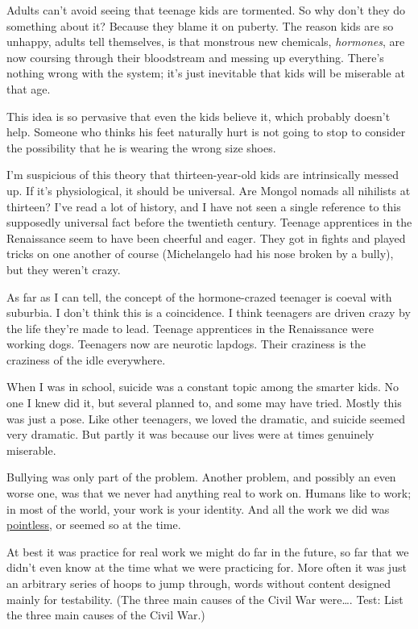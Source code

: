 Adults can't avoid seeing that teenage kids are tormented. So why don't
they do something about it? Because they blame it on puberty. The reason
kids are so unhappy, adults tell themselves, is that monstrous new
chemicals, \emph{hormones}, are now coursing through their bloodstream
and messing up everything. There's nothing wrong with the system; it's
just inevitable that kids will be miserable at that age.

This idea is so pervasive that even the kids believe it, which probably
doesn't help. Someone who thinks his feet naturally hurt is not going to
stop to consider the possibility that he is wearing the wrong size
shoes.

I'm suspicious of this theory that thirteen-year-old kids are
intrinsically messed up. If it's physiological, it should be universal.
Are Mongol nomads all nihilists at thirteen? I've read a lot of history,
and I have not seen a single reference to this supposedly universal fact
before the twentieth century. Teenage apprentices in the Renaissance
seem to have been cheerful and eager. They got in fights and played
tricks on one another of course (Michelangelo had his nose broken by a
bully), but they weren't crazy.

As far as I can tell, the concept of the hormone-crazed teenager is
coeval with suburbia. I don't think this is a coincidence. I think
teenagers are driven crazy by the life they're made to lead. Teenage
apprentices in the Renaissance were working dogs. Teenagers now are
neurotic lapdogs. Their craziness is the craziness of the idle
everywhere.

When I was in school, suicide was a constant topic among the smarter
kids. No one I knew did it, but several planned to, and some may have
tried. Mostly this was just a pose. Like other teenagers, we loved the
dramatic, and suicide seemed very dramatic. But partly it was because
our lives were at times genuinely miserable.

Bullying was only part of the problem. Another problem, and possibly an
even worse one, was that we never had anything real to work on. Humans
like to work; in most of the world, your work is your identity. And all
the work we did was \href{essay.html}{pointless}, or seemed so at the
time.

At best it was practice for real work we might do far in the future, so
far that we didn't even know at the time what we were practicing for.
More often it was just an arbitrary series of hoops to jump through,
words without content designed mainly for testability. (The three main
causes of the Civil War were\ldots. Test: List the three main causes of
the Civil War.)

